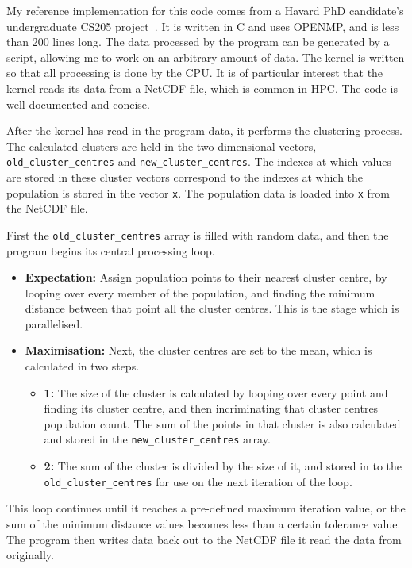 My reference implementation for this code comes from a Havard PhD candidate's undergraduate CS205 project~\cite{CS205}. It is written in C and uses OPENMP, and is less than 200 lines long. The data processed by the program can be generated by a script, allowing me to work on an arbitrary amount of data. The kernel is written so that all processing is done by the CPU\@. It is of particular interest that the kernel reads its data from a NetCDF file, which is common in HPC\@. The code is well documented and concise.

After the kernel has read in the program data, it performs the clustering process. The calculated clusters are held in the two dimensional vectors, \texttt{old\_cluster\_centres} and \texttt{new\_cluster\_centres}. The indexes at which values are stored in these cluster vectors correspond to the indexes at which the population is stored in the vector \texttt{x}. The population data is loaded into \texttt{x} from the NetCDF file.

First the \texttt{old\_cluster\_centres} array is filled with random data, and then the program begins its central processing loop.

\begin{itemize}
  \item \textbf{Expectation:} Assign population points to their nearest cluster centre, by looping over every member of the population, and finding the minimum distance between that point all the cluster centres. This is the stage which is parallelised.
  \item \textbf{Maximisation:} Next, the cluster centres are set to the mean, which is calculated in two steps.
  \begin{itemize}
    \item \textbf{1:} The size of the cluster is calculated by looping over every point and finding its cluster centre, and then incriminating that cluster centres population count. The sum of the points in that cluster is also calculated and stored in the \texttt{new\_cluster\_centres} array.
   \item \textbf{2:} The sum of the cluster is divided by the size of it, and stored in to the \texttt{old\_cluster\_centres} for use on the next iteration of the loop.
   \end{itemize}
\end{itemize}
This loop continues until it reaches a pre-defined maximum iteration value, or the sum of the minimum distance values becomes less than a certain tolerance value. The program then writes data back out to the NetCDF file it read the data from originally.

